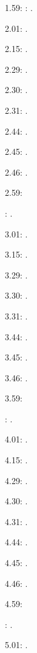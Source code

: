 \documentclass[italian]{article}
\begin{document}
1.59:   
:  .

2.01:   . 

2.15:   . 

2.29:   . 

2.30:   .

2.31:   .

2.44:   .

2.45:   .

2.46:   .

2.59:   

:  .

3.01:   . 

3.15:   . 

3.29:   . 

3.30:   .

3.31:   .

3.44:   .

3.45:   .

3.46:   .

3.59:   

:  .

4.01:   . 

4.15:   . 

4.29:   . 

4.30:   .

4.31:   .

4.44:   .

4.45:   .

4.46:   .

4.59:   

:  .

5.01:   . 
\end{document}
